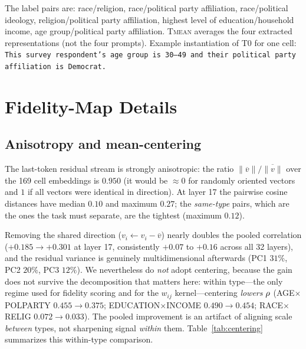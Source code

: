 The label pairs are: race/religion, race/political party affiliation,
race/political ideology, religion/political party affiliation, highest
level of education/household income, age group/political party
affiliation. \textsc{Tmean} averages the four extracted representations
(not the four prompts). Example instantiation of T0 for one cell:
\texttt{This survey respondent's age group is 30--49 and their political
party affiliation is Democrat.}

\section{Fidelity-Map Details}

\subsection{Anisotropy and mean-centering}
\label{app:anisotropy}
The last-token residual stream is strongly anisotropic: the ratio
$\lVert\overline{v}\rVert / \overline{\lVert v\rVert}$ over the 169 cell
embeddings is $0.950$ (it would be $\approx0$ for randomly oriented
vectors and $1$ if all vectors were identical in direction). At layer 17
the pairwise cosine distances have median $0.10$ and maximum $0.27$; the
\emph{same-type} pairs, which are the ones the task must separate, are
the tightest (maximum $0.12$).

Removing the shared direction ($v_i \leftarrow v_i - \overline{v}$) nearly
doubles the pooled correlation ($+0.185 \to +0.301$ at layer 17,
consistently $+0.07$ to $+0.16$ across all 32 layers), and the residual
variance is genuinely multidimensional afterwards (PC1 $31\%$, PC2
$20\%$, PC3 $12\%$). We nevertheless do \emph{not} adopt centering,
because the gain does not survive the decomposition that matters here:
within type---the only regime used for fidelity scoring and for the
$w_{ij}$ kernel---centering \emph{lowers} $\rho$
(AGE$\times$POLPARTY $0.455\to0.375$; EDUCATION$\times$INCOME
$0.490\to0.454$; RACE$\times$RELIG $0.072\to0.033$). The pooled
improvement is an artifact of aligning scale \emph{between} types, not
sharpening signal \emph{within} them. Table~\ref{tab:centering}
summarizes this within-type comparison.

